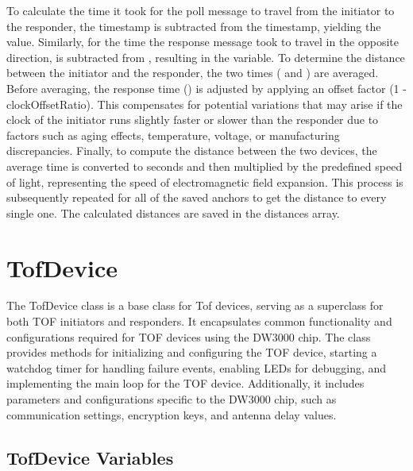 To calculate the time it took for the poll message to travel from the initiator to the responder, the  timestamp is subtracted from the  timestamp, yielding the  value. Similarly, for the time the response message took to travel in the opposite direction,  is subtracted from , resulting in the  variable.
\vspace{4pt}
\newline
To determine the distance between the initiator and the responder, the two times ( and ) are averaged. Before averaging, the response time () is adjusted by applying an offset factor (1 - clockOffsetRatio). This compensates for potential variations that may arise if the clock of the initiator runs slightly faster or slower than the responder due to factors such as aging effects, temperature, voltage, or manufacturing discrepancies.
\vspace{4pt}
\newline
Finally, to compute the distance between the two devices, the average time is converted to seconds and then multiplied by the predefined speed of light, representing the speed of electromagnetic field expansion.
\vspace{4pt}
\newline
This process is subsequently repeated for all of the saved anchors to get the distance to every single one. 
The calculated distances are saved in the distances array. 



\section{TofDevice}
\label{sec:TofDevice}
The TofDevice class is a base class for Tof devices, serving as a superclass for both TOF initiators and responders. 
It encapsulates common functionality and configurations required for TOF devices using the DW3000 chip.
The class provides methods for initializing and configuring the TOF device, starting a watchdog timer for handling failure events, enabling LEDs for debugging, and implementing the main loop for the TOF device.
Additionally, it includes parameters and configurations specific to the DW3000 chip, such as communication settings, encryption keys, and antenna delay values.

\subsection{TofDevice Variables}
\label{subsec:TofDevice_Variables}

